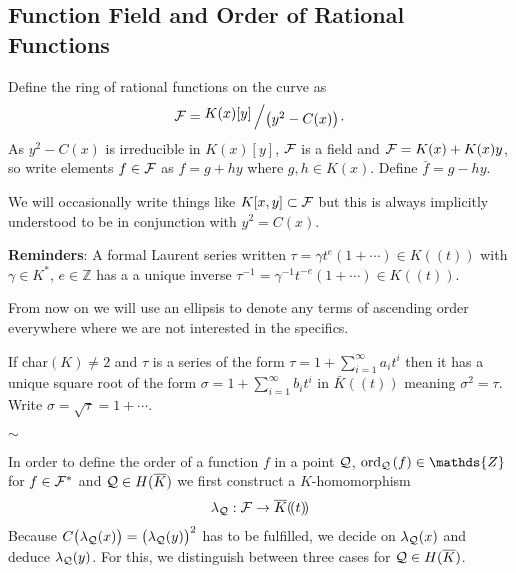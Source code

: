 \documentclass[english,11pt,a4paper]{article}
\begin{document}
\subsection{Function Field and Order of Rational Functions}

\begin{defin}
  Define the ring of rational functions on the curve as
  \begin{align*}
    \F = \bigslant{K(x)[y]}{\big(y^2-C(x)\big)}.
  \end{align*}
  As $y^2-C(x)$ is irreducible in $K(x)[y]$, $\mathcal{F}$ is a field
  and $\mathcal{F} = K(x) + K(x) y$, so write elements $f \in \mathcal{F}$ as $f = g + hy$ where $g,h \in K(x)$. Define $\bar f = g - hy$.

  We will occasionally write things like $K[x,y] \subset \mathcal{F}$ but this is always implicitly understood to be in conjunction with $y^2=C(x)$.
\end{defin}

\vspace{3mm}

\textbf{Reminders}: A formal Laurent series written $\tau = \gamma t^e (1 + \cdots)\in K (\! (t)\! )$ with $\gamma \in K^*$, $e \in \mathds{Z}$ has a a unique inverse $\tau^{-1} = \gamma^{-1} t^{-e} (1 + \cdots) \in K (\! (t)\! )$.

From now on we will use an ellipsis to denote any terms of ascending order everywhere where we are not interested in the specifics.

If char$(K) \neq 2$ and $\tau$ is a series of the form $\tau = 1 + \sum_{i = 1}^{\infty} a_i t^i$ then it has a unique square root of the form $\sigma = 1+\sum_{i = 1}^{\infty} b_i t^i$ in $\bar K (\! (t)\! )$ meaning $\sigma^2 = \tau$. Write $\sigma = \sqrt \tau = 1 + \cdots$.

\vspace{-3mm}
\begin{center}
$\sim$
\end{center}

In order to define the order of a function $f$ in a point $\mathcal{Q}$, $\ordq (f) \in \mathds{Z}$ for $f \in \mathcal{F}^*$ and $\mathcal{Q} \in H(\overline K)$ we first construct a $K$-homomorphism
\begin{align*}
  \lambda_{\mathcal{Q}}: \mathcal{F} \rightarrow \overline K (\! (t)\! )
\end{align*}
Because $C\big(\lambda_{\mathcal{Q}}(x)\big)=\big(\lambda_{\mathcal{Q}}(y)\big)^2$ has to be fulfilled, we decide on $\lambda_{\mathcal{Q}}(x)$ and deduce $\lambda_{\mathcal{Q}}(y)$. For this, we distinguish between three cases for $\mathcal{Q} \in H(\overline K)$.
\end{document}
